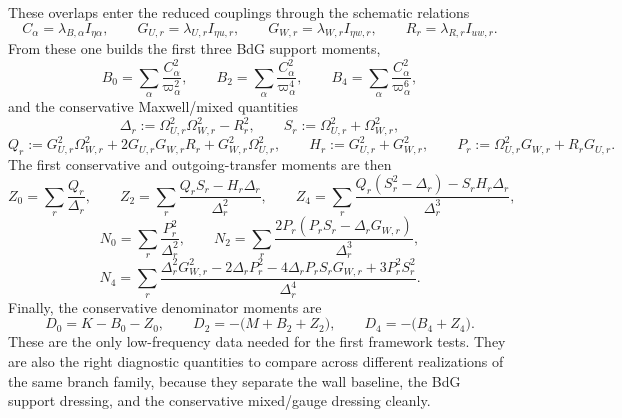 \documentclass[11pt]{article}
\theoremstyle{definition}
\begin{document}
These overlaps enter the reduced couplings through the schematic relations
\begin{equation}
 C_\alpha=\lambda_{B,\alpha}I_{\eta\alpha},
 \qquad
 G_{U,r}=\lambda_{U,r}I_{\eta u,r},
 \qquad
 G_{W,r}=\lambda_{W,r}I_{\eta w,r},
 \qquad
 R_r=\lambda_{R,r}I_{uw,r}.
 \label{eq:howto-reduced-couplings}
\end{equation}
From these one builds the first three BdG support moments,
\begin{equation}
 B_0=\sum_\alpha \frac{C_\alpha^2}{\varpi_\alpha^2},
 \qquad
 B_2=\sum_\alpha \frac{C_\alpha^2}{\varpi_\alpha^4},
 \qquad
 B_4=\sum_\alpha \frac{C_\alpha^2}{\varpi_\alpha^6},
 \label{eq:howto-B-moments}
\end{equation}
and the conservative Maxwell/mixed quantities
\begin{equation}
 \Delta_r:=\Omega_{U,r}^2\Omega_{W,r}^2-R_r^2,
 \qquad
 S_r:=\Omega_{U,r}^2+\Omega_{W,r}^2,
 \label{eq:howto-Delta-S}
\end{equation}
\begin{equation}
 Q_r:=G_{U,r}^2\Omega_{W,r}^2+2G_{U,r}G_{W,r}R_r+G_{W,r}^2\Omega_{U,r}^2,
 \qquad
 H_r:=G_{U,r}^2+G_{W,r}^2,
 \qquad
 P_r:=\Omega_{U,r}^2G_{W,r}+R_rG_{U,r}.
 \label{eq:howto-Q-H-P}
\end{equation}
The first conservative and outgoing-transfer moments are then
\begin{equation}
 Z_0=\sum_r \frac{Q_r}{\Delta_r},
 \qquad
 Z_2=\sum_r \frac{Q_rS_r-H_r\Delta_r}{\Delta_r^2},
 \qquad
 Z_4=\sum_r \frac{Q_r(S_r^2-\Delta_r)-S_rH_r\Delta_r}{\Delta_r^3},
 \label{eq:howto-Z-moments}
\end{equation}
\begin{equation}
 N_0=\sum_r \frac{P_r^2}{\Delta_r^2},
 \qquad
 N_2=\sum_r \frac{2P_r(P_rS_r-\Delta_r G_{W,r})}{\Delta_r^3},
 \label{eq:howto-N-moments-a}
\end{equation}
\begin{equation}
 N_4=\sum_r
 \frac{\Delta_r^2G_{W,r}^2-2\Delta_r P_r^2-4\Delta_r P_rS_rG_{W,r}+3P_r^2S_r^2}{\Delta_r^4}.
 \label{eq:howto-N-moments-b}
\end{equation}
Finally, the conservative denominator moments are
\begin{equation}
 D_0=K-B_0-Z_0,
 \qquad
 D_2=-\bigl(M+B_2+Z_2\bigr),
 \qquad
 D_4=-\bigl(B_4+Z_4\bigr).
 \label{eq:howto-D-moments}
\end{equation}
These are the only low-frequency data needed for the first framework tests. They are also the right diagnostic quantities to compare across different realizations of the same branch family, because they separate the wall baseline, the BdG support dressing, and the conservative mixed/gauge dressing cleanly.
\end{document}
